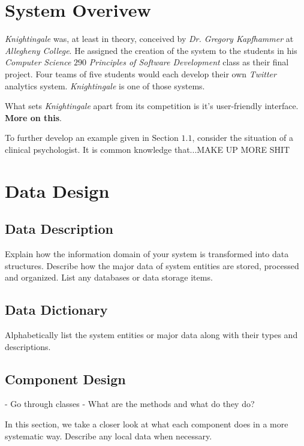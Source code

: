 \documentclass[a4paper, 12pt]{article}
\begin{document}
\section{System Overivew} \label{sec:overview}
\begin{adjustwidth}{1em}{0pt}
\textit{Knightingale} was, at least in theory, conceived by \textit{Dr. Gregory Kapfhammer} at \textit{Allegheny College}. He assigned the creation of the system to the students in his \textit{Computer Science} $290$ \textit{Principles of Software Development} class as their final project. Four teams of five students would each develop their own \textit{Twitter} analytics system. \textit{Knightingale} is one of those systems. \newline

\noindent What sets \textit{Knightingale} apart from its competition is it's user-friendly interface. \textbf{More on this}. \newline

\noindent To further develop an example given in Section $1.1$, consider the situation of a clinical psychologist. It is common knowledge that...MAKE UP MORE SHIT
\end{adjustwidth}
 
\section{Data Design} \label{sec:datadesign}
\subsection{Data Description} \label{sec:datadescript}
\begin{adjustwidth}{2em}{0pt}
Explain how the information domain of your system is transformed into data structures. Describe how the major data of system entities are stored, processed and organized. List any databases or data storage items. 
\end{adjustwidth}

\subsection{Data Dictionary} \label{sec:dictionary}
\begin{adjustwidth}{2em}{0pt}
Alphabetically list the system entities or major data along with their types and descriptions.
\end{adjustwidth}

\subsection{Component Design} \label{sec:component}
\begin{adjustwidth}{1em}{0pt}
- Go through classes
- What are the methods and what do they do?

In this section, we take a closer look at what each component does in a more systematic way. 
Describe any local data when necessary.
\end{adjustwidth}
\end{document}
